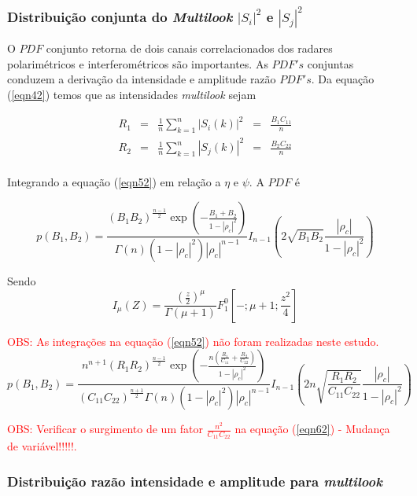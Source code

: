 \documentclass[12pt,a4paper]{article}
\begin{document}
\subsubsection{Distribuição conjunta do {\it Multilook} $|S_i|^2$ e $|S_j|^2$ }

O $PDF$ conjunto retorna de dois canais correlacionados dos radares polarimétricos e interferométricos são importantes. As $PDF's$ conjuntas conduzem a derivação da intensidade e amplitude razão $PDF's$. Da equação (\ref{eqn42}) temos que as intensidades {\it multilook} sejam 

\begin{equation}\label{eqn59}
\begin{array}{ccccc}
	R_1&=&\frac{1}{n}\sum_{k=1}^{n}|S_i(k)|^2&=&\frac{B_1C_{11}}{n}\\
	R_2&=&\frac{1}{n}\sum_{k=1}^{n}|S_j(k)|^2&=&\frac{B_2C_{22}}{n}\\
\end{array}
\end{equation}

Integrando a equação (\ref{eqn52}) em relação a $\eta$ e $\psi$. A $PDF$ é

\begin{equation}\label{eqn60}
	p(B_1,B_2)=\frac{\left(B_1B_2\right)^{\frac{n-1}{2}}\exp\left(-\frac{B_1+B_2}{1-|\rho_c|^2}\right)}{\Gamma(n)(1-|\rho_c|^2)|\rho_c|^{n-1}}I_{n-1}\left(2\sqrt{B_1B_2}\frac{|\rho_c|}{1-|\rho_c|^2}\right)
\end{equation}

Sendo
\begin{equation}\label{eqn61}
	I_{\mu}(Z)=\frac{(\frac{z}{2})^{\mu}}{\Gamma(\mu+1)} F_{1}^{0}[-;\mu+1;\frac{z^2}{4}]
\end{equation}

\textcolor{red}{OBS: As integrações na equação (\ref{eqn52}) não foram realizadas neste estudo.}
\begin{equation}\label{eqn62}
	p(B_1,B_2)=\frac{n^{n+1}\left(R_1R_2\right)^{\frac{n-1}{2}}\exp\left(-\frac{n(\frac{R_1}{C_{11}}+\frac{R_2}{C_{22}})}{1-|\rho_c|^2}\right)}{(C_{11}C_{22})^{\frac{n+1}{2}}\Gamma(n)(1-|\rho_c|^2)|\rho_c|^{n-1}}I_{n-1}\left(2n\sqrt{\frac{R_1R_2}{C_{11}C_{22}}}\frac{|\rho_c|}{1-|\rho_c|^2}\right)
\end{equation}

\textcolor{red}{OBS: Verificar o surgimento de um fator $\frac{n^2}{C_{11}C_{22}}$ na equação  (\ref{eqn62}) - Mudança de variável!!!!!.}

\subsubsection{Distribuição razão intensidade e amplitude para {\it multilook}}
\end{document}
